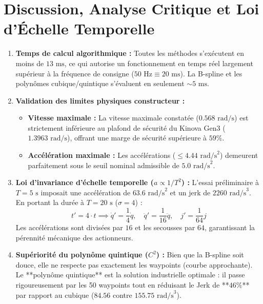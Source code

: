 \documentclass[11pt,a4paper]{report}
\begin{document}
\section{Discussion, Analyse Critique et Loi d'Échelle Temporelle}
\begin{enumerate}
    \item \textbf{Temps de calcul algorithmique :} Toutes les méthodes s'exécutent en moins de $13\text{ ms}$, ce qui autorise un fonctionnement en temps réel largement supérieur à la fréquence de consigne ($50\text{ Hz} \equiv 20\text{ ms}$). La B-spline et les polynômes cubique/quintique s'évaluent en seulement $\sim 5\text{ ms}$.
    \item \textbf{Validation des limites physiques constructeur :}
    \begin{itemize}
        \item \textbf{Vitesse maximale :} La vitesse maximale constatée ($0.568\text{ rad/s}$) est strictement inférieure au plafond de sécurité du Kinova Gen3 ($1.3963\text{ rad/s}$), offrant une marge de sécurité supérieure à $59\%$.
        \item \textbf{Accélération maximale :} Les accélérations ($\le 4.44\text{ rad/s}^2$) demeurent parfaitement sous le seuil nominal admissible de $5.0\text{ rad/s}^2$.
    \end{itemize}
    \item \textbf{Loi d'invariance d'échelle temporelle ($a \propto 1/T^2$) :} L'essai préliminaire à $T = 5\text{ s}$ imposait une accélération de $63.6\text{ rad/s}^2$ et un jerk de $2260\text{ rad/s}^3$. En portant la durée à $T = 20\text{ s}$ ($\sigma = 4$) :
    \begin{equation}
        t' = 4 \cdot t \implies \dot{q}' = \frac{1}{4}\dot{q}, \quad \ddot{q}' = \frac{1}{16}\ddot{q}, \quad j' = \frac{1}{64}j
    \end{equation}
    Les accélérations sont divisées par $16$ et les secousses par $64$, garantissant la pérennité mécanique des actionneurs.
    \item \textbf{Supériorité du polynôme quintique ($C^2$) :} Bien que la B-spline soit douce, elle ne respecte pas exactement les waypoints (courbe approchante). Le **polynôme quintique** est la solution industrielle optimale : il passe rigoureusement par les 50 waypoints tout en réduisant le Jerk de **$46\%$** par rapport au cubique ($84.56$ contre $155.75\text{ rad/s}^3$).
\end{enumerate}
\end{document}
